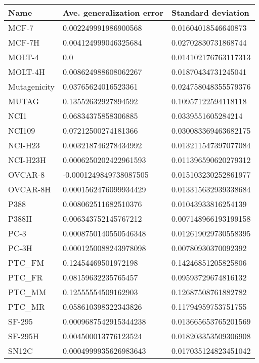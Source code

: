 \begin{table}[!ht]
    \centering
    \begin{tabular}{p{3.5cm}|p{5cm}p{5cm}}
    \hline
    \toprule
        Name & Ave. generalization error & Standard deviation \\ 
    \midrule
        MCF-7 & 0.002249991986900568 & 0.01604018546640873 \\
        MCF-7H & 0.004124999046325684 & 0.02702830731868744 \\
        MOLT-4 & 0.0 & 0.014102176763117313 \\
        MOLT-4H & 0.008624988608062267 & 0.01870434731245041 \\
        Mutagenicity & 0.03765624016523361 & 0.024758048355579376 \\
        MUTAG & 0.13552632927894592 & 0.10957122594118118 \\
        NCI1 & 0.06834375858306885 & 0.0339551605284214 \\
        NCI109 & 0.07212500274181366 & 0.030083369463682175 \\
        NCI-H23 & 0.003218746278434992 & 0.013211547397077084 \\
        NCI-H23H & 0.0006250202422961593 & 0.011396590620279312 \\
        OVCAR-8 & -0.0001249849738087505 & 0.015103230252861977 \\
        OVCAR-8H & 0.0001562476099934429 & 0.013315632939338684 \\
        P388 & 0.008062511682510376 & 0.01043933816254139 \\
        P388H & 0.006343752145767212 & 0.007148966193199158 \\
        PC-3 & 0.0008750140550546348 & 0.012619029730558395 \\
        PC-3H & 0.0001250088243978098 & 0.00780930370092392 \\
        PTC\_FM & 0.12454469501972198 & 0.14246851205825806 \\
        PTC\_FR & 0.08159632235765457 & 0.09593729674816132 \\
        PTC\_MM & 0.12555554509162903 & 0.12687508761882782 \\
        PTC\_MR & 0.058610398322343826 & 0.11794959753751755 \\
        SF-295 & 0.0009687542915344238 & 0.013665653765201569 \\
        SF-295H & 0.004500013776123524 & 0.018203353509306908 \\
        SN12C & 0.0004999935626983643 & 0.017035124823451042 \\

\end{tabular}
\end{table}
